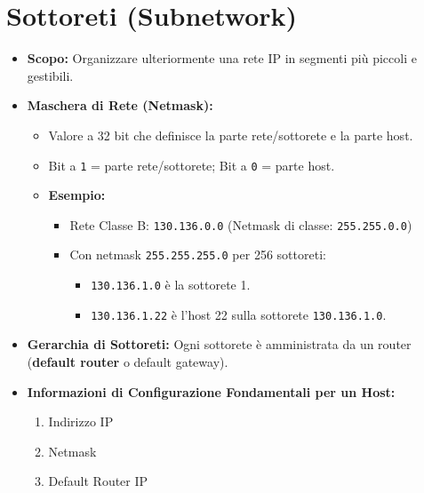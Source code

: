 \documentclass{article}
\begin{document}
\section{Sottoreti (Subnetwork)}
\begin{itemize}
    \item \textbf{Scopo:} Organizzare ulteriormente una rete IP in segmenti più piccoli e gestibili.
    \item \textbf{Maschera di Rete (Netmask):}
    \begin{itemize}
        \item Valore a 32 bit che definisce la parte rete/sottorete e la parte host.
        \item Bit a \texttt{1} = parte rete/sottorete; Bit a \texttt{0} = parte host.
        \item \textbf{Esempio:}
        \begin{itemize}
            \item Rete Classe B: \texttt{130.136.0.0} (Netmask di classe: \texttt{255.255.0.0})
            \item Con netmask \texttt{255.255.255.0} per 256 sottoreti:
            \begin{itemize}
                \item \texttt{130.136.1.0} è la sottorete 1.
                \item \texttt{130.136.1.22} è l'host 22 sulla sottorete \texttt{130.136.1.0}.
            \end{itemize}
        \end{itemize}
    \end{itemize}
    \item \textbf{Gerarchia di Sottoreti:} Ogni sottorete è amministrata da un router (\textbf{default router} o default gateway).
    \item \textbf{Informazioni di Configurazione Fondamentali per un Host:}
    \begin{enumerate}
        \item Indirizzo IP
        \item Netmask
        \item Default Router IP
    \end{enumerate}
\end{itemize}
\end{document}
